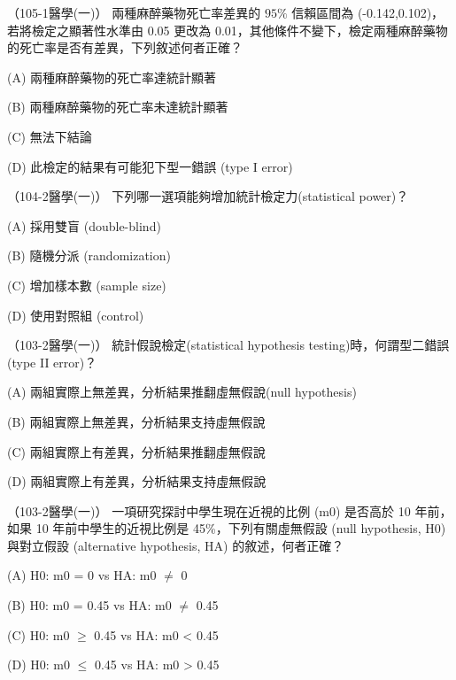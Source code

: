     \begin{docexam}{（105-1醫學(一)）}
        兩種麻醉藥物死亡率差異的 $95\%$ 信賴區間為 (-0.142,0.102)，若將檢定之顯著性水準由 0.05 更改為 0.01，其他條件不變下，檢定兩種麻醉藥物的死亡率是否有差異，下列敘述何者正確？

        (A) 兩種麻醉藥物的死亡率達統計顯著

        (B) 兩種麻醉藥物的死亡率未達統計顯著

        (C) 無法下結論

        (D) 此檢定的結果有可能犯下型一錯誤 (type I error)
    \end{docexam}
    
    \begin{docexam}{（104-2醫學(一)）}
        下列哪一選項能夠增加統計檢定力(statistical power)？

        (A) 採用雙盲 (double-blind)

        (B) 隨機分派 (randomization)

        (C) 增加樣本數 (sample size)

        (D) 使用對照組 (control)
    \end{docexam}
    
    \begin{docexam}{（103-2醫學(一)）}
        統計假說檢定(statistical hypothesis testing)時，何謂型二錯誤(type II error)？

        (A) 兩組實際上無差異，分析結果推翻虛無假說(null hypothesis)

        (B) 兩組實際上無差異，分析結果支持虛無假說

        (C) 兩組實際上有差異，分析結果推翻虛無假說

        (D) 兩組實際上有差異，分析結果支持虛無假說
    \end{docexam}
    
    \begin{docexam}{（103-2醫學(一)）}
        一項研究探討中學生現在近視的比例 (m0) 是否高於 10 年前，如果 10 年前中學生的近視比例是 45\%，下列有關虛無假設 (null hypothesis, H0) 與對立假設 (alternative hypothesis, HA) 的敘述，何者正確？

        (A) H0: m0 = 0 vs HA: m0 $\ne$ 0

        (B) H0: m0 = 0.45 vs HA: m0 $\ne$ 0.45

        (C) H0: m0 $\ge$ 0.45 vs HA: m0 < 0.45

        (D) H0: m0 $\le$ 0.45 vs HA: m0 > 0.45
    \end{docexam}
    
